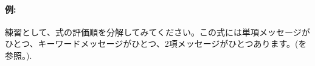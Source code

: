 \documentclass[a4paper,10pt,twoside]{book}
\begin{document}




\paragraph{例:} 練習として、式の評価順を分解してみてください。この式には単項メッセージがひとつ、キーワードメッセージがひとつ、2項メッセージがひとつあります。(を参照。).

\end{document}
